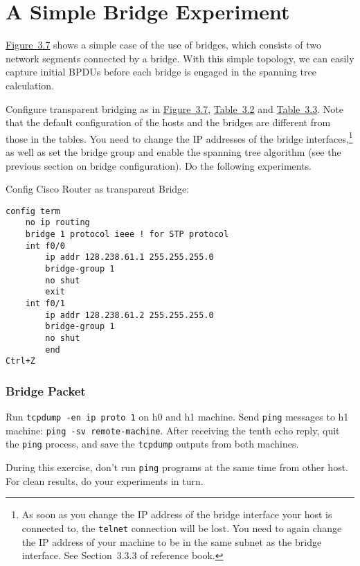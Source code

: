 \documentclass{../UTNetLab}
\begin{document}
\part{A Simple Bridge Experiment}
    \hyperref[fig:3.7]{Figure~3.7} shows a simple case of the use of bridges, which consists of two network segments connected by a bridge.
    With this simple topology, we can easily capture initial BPDUs before each bridge is engaged in the spanning tree calculation.

    Configure transparent bridging as in \hyperref[fig:3.7]{Figure~3.7}, \hyperref[tab:3.2]{Table~3.2} and \hyperref[tab:3.3]{Table~3.3}.
    Note that the default configuration of the hosts and the bridges are different from those in the tables.
    You need to change the IP addresses of the bridge interfaces,\footnote{As soon as you change the IP address of the bridge interface your host is connected to, the \lstinline{telnet} connection will be lost.
    You need to again change the IP address of your machine to be in the same subnet as the bridge interface. See Section~3.3.3  of reference book.} as well as set the bridge group and enable the spanning tree algorithm (see the previous section on bridge configuration).
    Do the following experiments.

    Config Cisco Router as transparent Bridge:
    \begin{lstlisting}[language={cisco}]
config term
    no ip routing
    bridge 1 protocol ieee ! for STP protocol
    int f0/0
        ip addr 128.238.61.1 255.255.255.0
        bridge-group 1
        no shut
        exit
    int f0/1
        ip addr 128.238.61.2 255.255.255.0
        bridge-group 1
        no shut
        end
Ctrl+Z
    \end{lstlisting}

\section{Bridge Packet}
    Run \lstinline{tcpdump -en ip proto 1} on h0 and h1 machine. Send \lstinline{ping} messages to h1 machine: \lstinline[emph={remote-machine}]{ping -sv remote-machine}.
    After receiving the tenth echo reply, quit the \lstinline{ping} process, and save the \lstinline{tcpdump} outputs from both machines.

    During this exercise, don’t run \lstinline{ping} programs at the same time from other host. For clean results, do your experiments in turn.
    
\end{document}
